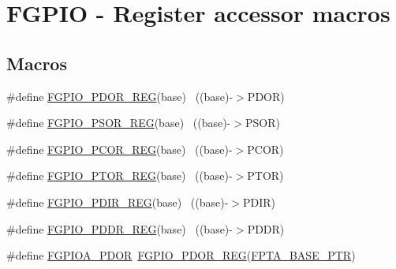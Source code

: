 \hypertarget{group___f_g_p_i_o___register___accessor___macros}{}\section{F\+G\+P\+IO -\/ Register accessor macros}
\label{group___f_g_p_i_o___register___accessor___macros}
\subsection*{Macros}
\begin{DoxyCompactItemize}
\item 
\#define \hyperlink{group___f_g_p_i_o___register___accessor___macros_ga15263a8d3411201623c2541b15a160c9}{F\+G\+P\+I\+O\+\_\+\+P\+D\+O\+R\+\_\+\+R\+EG}(base)                                      ~((base)-\/$>$P\+D\+OR)
\item 
\#define \hyperlink{group___f_g_p_i_o___register___accessor___macros_ga0fd5e604dcdaba6e42f0d06f9e4410bb}{F\+G\+P\+I\+O\+\_\+\+P\+S\+O\+R\+\_\+\+R\+EG}(base)                                      ~((base)-\/$>$P\+S\+OR)
\item 
\#define \hyperlink{group___f_g_p_i_o___register___accessor___macros_gab5033219fb0e50c7dd60b3fbf1cc2dde}{F\+G\+P\+I\+O\+\_\+\+P\+C\+O\+R\+\_\+\+R\+EG}(base)                                      ~((base)-\/$>$P\+C\+OR)
\item 
\#define \hyperlink{group___f_g_p_i_o___register___accessor___macros_gabbed07bd5d1202717414b3682c03039c}{F\+G\+P\+I\+O\+\_\+\+P\+T\+O\+R\+\_\+\+R\+EG}(base)                                      ~((base)-\/$>$P\+T\+OR)
\item 
\#define \hyperlink{group___f_g_p_i_o___register___accessor___macros_gacc856fb3636de989a65e71d60efb8ef8}{F\+G\+P\+I\+O\+\_\+\+P\+D\+I\+R\+\_\+\+R\+EG}(base)                                      ~((base)-\/$>$P\+D\+IR)
\item 
\#define \hyperlink{group___f_g_p_i_o___register___accessor___macros_ga47e9fea71a8834584cf1233cbad492bc}{F\+G\+P\+I\+O\+\_\+\+P\+D\+D\+R\+\_\+\+R\+EG}(base)                                      ~((base)-\/$>$P\+D\+DR)
\item 
\#define \hyperlink{group___f_g_p_i_o___register___accessor___macros_gae9758c811074785f7b017f89828ffa84}{F\+G\+P\+I\+O\+A\+\_\+\+P\+D\+OR}~\hyperlink{group___f_g_p_i_o___register___accessor___macros_ga15263a8d3411201623c2541b15a160c9}{F\+G\+P\+I\+O\+\_\+\+P\+D\+O\+R\+\_\+\+R\+EG}(\hyperlink{group___f_g_p_i_o___peripheral_ga4b0d89f517528ab7c1d2fdefe4c863d8}{F\+P\+T\+A\+\_\+\+B\+A\+S\+E\+\_\+\+P\+TR})

\end{DoxyCompactItemize}
